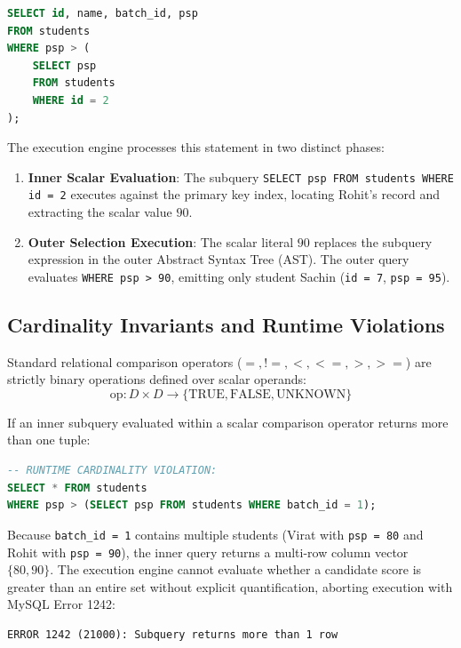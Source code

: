 \documentclass[10pt,twocolumn,letterpaper]{article}
\begin{document}
\begin{lstlisting}[language=SQL]
SELECT id, name, batch_id, psp
FROM students
WHERE psp > (
    SELECT psp 
    FROM students 
    WHERE id = 2
);
\end{lstlisting}

The execution engine processes this statement in two distinct phases:
\begin{enumerate}
    \item \textbf{Inner Scalar Evaluation}: The subquery \texttt{SELECT psp FROM students WHERE id = 2} executes against the primary key index, locating Rohit's record and extracting the scalar value $90$.
    \item \textbf{Outer Selection Execution}: The scalar literal $90$ replaces the subquery expression in the outer Abstract Syntax Tree (AST). The outer query evaluates \texttt{WHERE psp > 90}, emitting only student Sachin (\texttt{id = 7}, \texttt{psp = 95}).
\end{enumerate}

\subsection{Cardinality Invariants and Runtime Violations}
Standard relational comparison operators ($=, !=, <, <=, >, >=$) are strictly binary operations defined over scalar operands:
\begin{equation}
\text{op}: D \times D \longrightarrow \{\text{TRUE}, \text{FALSE}, \text{UNKNOWN}\}
\end{equation}

If an inner subquery evaluated within a scalar comparison operator returns more than one tuple:
\begin{lstlisting}[language=SQL]
-- RUNTIME CARDINALITY VIOLATION:
SELECT * FROM students
WHERE psp > (SELECT psp FROM students WHERE batch_id = 1);
\end{lstlisting}
Because \texttt{batch\_id = 1} contains multiple students (Virat with \texttt{psp = 80} and Rohit with \texttt{psp = 90}), the inner query returns a multi-row column vector $\{80, 90\}$. The execution engine cannot evaluate whether a candidate score is greater than an entire set without explicit quantification, aborting execution with MySQL Error 1242:
\begin{lstlisting}[basicstyle=\ttfamily\scriptsize]
ERROR 1242 (21000): Subquery returns more than 1 row
\end{lstlisting}
\end{document}
